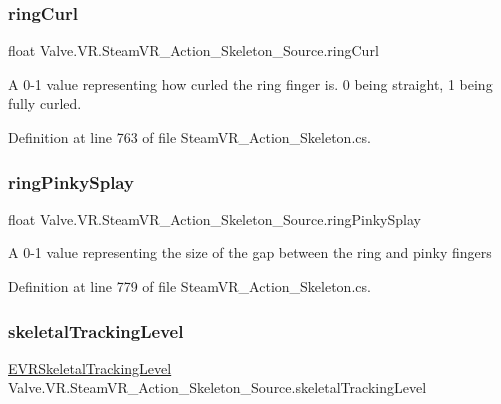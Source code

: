 \subsubsection{\texorpdfstring{ringCurl}{ringCurl}}
{\footnotesize\ttfamily float Valve.\+V\+R.\+Steam\+V\+R\+\_\+\+Action\+\_\+\+Skeleton\+\_\+\+Source.\+ring\+Curl\hspace{0.3cm}{\ttfamily [get]}}



A 0-\/1 value representing how curled the ring finger is. 0 being straight, 1 being fully curled. 



Definition at line 763 of file Steam\+V\+R\+\_\+\+Action\+\_\+\+Skeleton.\+cs.

\mbox{\label{class_valve_1_1_v_r_1_1_steam_v_r___action___skeleton___source_a28e97373e54fcb74766416b9ed5810c0}} 
\subsubsection{\texorpdfstring{ringPinkySplay}{ringPinkySplay}}
{\footnotesize\ttfamily float Valve.\+V\+R.\+Steam\+V\+R\+\_\+\+Action\+\_\+\+Skeleton\+\_\+\+Source.\+ring\+Pinky\+Splay\hspace{0.3cm}{\ttfamily [get]}}



A 0-\/1 value representing the size of the gap between the ring and pinky fingers 



Definition at line 779 of file Steam\+V\+R\+\_\+\+Action\+\_\+\+Skeleton.\+cs.

\mbox{\label{class_valve_1_1_v_r_1_1_steam_v_r___action___skeleton___source_aebe1b7e7ed80abc1bdcf1712092dddf8}} 
\subsubsection{\texorpdfstring{skeletalTrackingLevel}{skeletalTrackingLevel}}
{\footnotesize\ttfamily \mbox{\hyperlink{namespace_valve_1_1_v_r_a6f46bd50fb65255d6537ab32a6bddc30}{E\+V\+R\+Skeletal\+Tracking\+Level}} Valve.\+V\+R.\+Steam\+V\+R\+\_\+\+Action\+\_\+\+Skeleton\+\_\+\+Source.\+skeletal\+Tracking\+Level\hspace{0.3cm}{\ttfamily [get]}}



